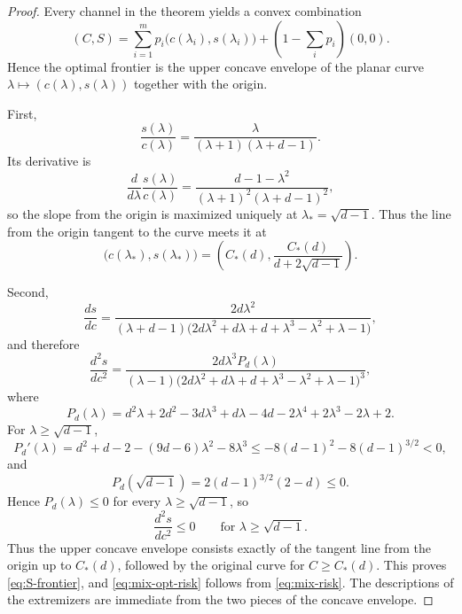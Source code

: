\documentclass[10pt,a4paper]{amsart}
\begin{document}
\begin{proof}
Every channel in the theorem yields a convex combination
\[
(C,S)=\sum_{i=1}^m p_i\bigl(c(\lambda_i),s(\lambda_i)\bigr)+(1-\sum_i p_i)(0,0).
\]
Hence the optimal frontier is the upper concave envelope of the planar curve
\(\lambda\mapsto (c(\lambda),s(\lambda))\) together with the origin.

First,
\[
\frac{s(\lambda)}{c(\lambda)}
=
\frac{\lambda}{(\lambda+1)(\lambda+d-1)}. \tag{10.8}\label{eq:ratio-sc}
\]
Its derivative is
\[
\frac{d}{d\lambda}\frac{s(\lambda)}{c(\lambda)}
=
\frac{d-1-\lambda^2}{(\lambda+1)^2(\lambda+d-1)^2}, \tag{10.9}\label{eq:ratio-derivative}
\]
so the slope from the origin is maximized uniquely at
\(
\lambda_\ast=\sqrt{d-1}
\).
Thus the line from the origin tangent to the curve meets it at
\[
\bigl(c(\lambda_\ast),s(\lambda_\ast)\bigr)
=
\left(
C_\ast(d),\frac{C_\ast(d)}{d+2\sqrt{d-1}}
\right).
\]

Second,
\[
\frac{ds}{dc}
=
\frac{2d\lambda^2}{(\lambda+d-1)\bigl(2d\lambda^2+d\lambda+d+\lambda^3-\lambda^2+\lambda-1\bigr)}, \tag{10.10}\label{eq:dsdc}
\]
and therefore
\[
\frac{d^2s}{dc^2}
=
\frac{2d\lambda^3 P_d(\lambda)}
{(\lambda-1)\bigl(2d\lambda^2+d\lambda+d+\lambda^3-\lambda^2+\lambda-1\bigr)^3}, \tag{10.11}\label{eq:d2sdc2}
\]
where
\[
P_d(\lambda)
=
d^2\lambda+2d^2-3d\lambda^3+d\lambda-4d-2\lambda^4+2\lambda^3-2\lambda+2.
\]
For \(\lambda\ge \sqrt{d-1}\),
\[
P_d'(\lambda)
=
d^2+d-2-(9d-6)\lambda^2-8\lambda^3
\le
-8(d-1)^2-8(d-1)^{3/2}<0, \tag{10.12}\label{eq:P-decreasing}
\]
and
\[
P_d(\sqrt{d-1})=2(d-1)^{3/2}(2-d)\le 0. \tag{10.13}\label{eq:P-at-star}
\]
Hence \(P_d(\lambda)\le 0\) for every \(\lambda\ge \sqrt{d-1}\), so
\[
\frac{d^2s}{dc^2}\le 0
\qquad\text{for } \lambda\ge \sqrt{d-1}. \tag{10.14}\label{eq:curve-concave}
\]
Thus the upper concave envelope consists exactly of the tangent line from the origin up to
\(C_\ast(d)\), followed by the original curve for \(C\ge C_\ast(d)\).
This proves \eqref{eq:S-frontier}, and \eqref{eq:mix-opt-risk} follows from \eqref{eq:mix-risk}.
The descriptions of the extremizers are immediate from the two pieces of the concave envelope.
\end{proof}
\end{document}
